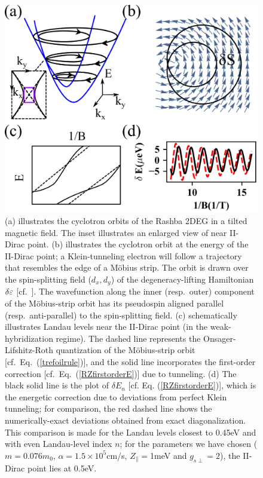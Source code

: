 \documentclass[aps, showpacs, twocolumn, notitlepage, superscriptaddress]{revtex4-1}
\begin{document}
\begin{figure}
\includegraphics[width=1.0\columnwidth]{RZ.png}
\caption{(a) illustrates the cyclotron orbits of the Rashba 2DEG in a tilted magnetic field. The inset illustrates an enlarged view of near II-Dirac point. (b) illustrates the cyclotron orbit at the energy of the II-Dirac point; a Klein-tunneling electron will follow a trajectory that resembles the edge of a M\"obius strip. The orbit is drawn over the  spin-splitting field ($d_x,d_y$) of the degeneracy-lifting Hamiltonian $\delta\varepsilon$ [cf.\ ]. The wavefunction along the inner (resp.\ outer) component of the M\"obius-strip orbit has its pseudospin aligned parallel (resp.\ anti-parallel) to the spin-splitting field. (c) schematically illustrates  Landau levels near the II-Dirac point (in the weak-hybridization regime). The dashed line represents the Onsager-Lifshitz-Roth quantization of the M\"obius-strip orbit [cf.\ Eq.\ (\ref{trefoilrule})], and the solid line incorporates the first-order correction [cf.\ Eq.\ (\ref{RZfirstorderE})] due to tunneling. (d) The black solid line is the plot of $\delta E_n$ [cf. Eq. (\ref{RZfirstorderE})], which is the energetic correction due to deviations from perfect Klein tunneling; for comparison, the red dashed line shows the numerically-exact deviations obtained from exact diagonalization. This comparison is made for the Landau levels closest to 0.45eV and with even Landau-level index $n$; for the parameters we have chosen ($m{=}0.076m_0$, $\alpha{=} 1.5\times10^{5}$cm/s, $Z_\parallel {=}$1meV and $g_{s\perp}=2$),  the II-Dirac point lies at 0.5eV.
\label{fig:RZ}}
\end{figure}
\end{document}
